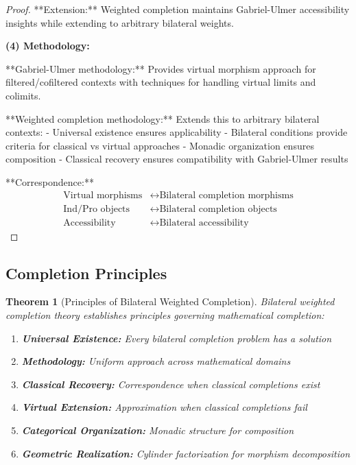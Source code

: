 \documentclass[11pt]{article}
\theoremstyle{plain}
\newtheorem{theorem}{Theorem}[section]
\theoremstyle{definition}
\theoremstyle{remark}
\begin{document}
\begin{proof}
**Extension:** Weighted completion maintains Gabriel-Ulmer accessibility insights while extending to arbitrary bilateral weights.

\textbf{(4) Methodology:}

**Gabriel-Ulmer methodology:** Provides virtual morphism approach for filtered/cofiltered contexts with techniques for handling virtual limits and colimits.

**Weighted completion methodology:** Extends this to arbitrary bilateral contexts:
- Universal existence ensures applicability
- Bilateral conditions provide criteria for classical vs virtual approaches  
- Monadic organization ensures composition
- Classical recovery ensures compatibility with Gabriel-Ulmer results

**Correspondence:**
\begin{align}
\text{Virtual morphisms} &\leftrightarrow \text{Bilateral completion morphisms} \\
\text{Ind/Pro objects} &\leftrightarrow \text{Bilateral completion objects} \\
\text{Accessibility} &\leftrightarrow \text{Bilateral accessibility}
\end{align}
\end{proof}

\subsection{Completion Principles}

\begin{theorem}[Principles of Bilateral Weighted Completion]\label{thm:universal-principles}
Bilateral weighted completion theory establishes principles governing mathematical completion:

\begin{enumerate}
\item \textbf{Universal Existence:} Every bilateral completion problem has a solution
\item \textbf{Methodology:} Uniform approach across mathematical domains  
\item \textbf{Classical Recovery:} Correspondence when classical completions exist
\item \textbf{Virtual Extension:} Approximation when classical completions fail
\item \textbf{Categorical Organization:} Monadic structure for composition
\item \textbf{Geometric Realization:} Cylinder factorization for morphism decomposition
\end{enumerate}
\end{theorem}
\end{document}
